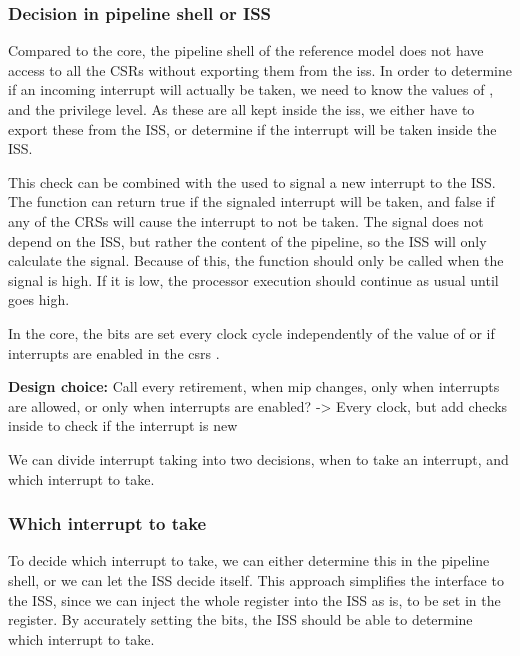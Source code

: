 \subsubsection{Decision in pipeline shell or ISS}


Compared to the core, the pipeline shell of the reference model does not have access to all the CSRs without exporting them from the \acrshort{iss}. In order to determine if an incoming interrupt will actually be taken, we need to know the values of ,  and the privilege level. As these are all kept inside the \acrshort{iss}, we either have to export these from the ISS, or determine if the interrupt will be taken inside the ISS. 

This check can be combined with the  used to signal a new interrupt to the ISS. The function can return true if the signaled interrupt will be taken, and false if any of the CRSs will cause the interrupt to not be taken. The  signal does not depend on the ISS, but rather the content of the pipeline, so the ISS will only calculate the  signal. Because of this, the  function should only be called when the  signal is high. If it is low, the processor execution should continue as usual until  goes high.

In the core, the  bits are set every clock cycle independently of the value of  or if interrupts are enabled in the \acrshort{csr}s \cite{}.

\textbf{Design choice:} Call  every retirement, when mip changes, only when interrupts are allowed, or only when interrupts are enabled? -> Every clock, but add checks inside to check if the interrupt is new


We can divide interrupt taking into two decisions, when to take an interrupt, and which interrupt to take.

\subsubsection{Which interrupt to take}

To decide which interrupt to take, we can either determine this in the pipeline shell, or we can let the ISS decide itself. This approach simplifies the interface to the ISS, since we can inject the whole  register into the ISS as is, to be set in the  register. By accurately setting the  bits, the ISS should be able to determine which interrupt to take.

